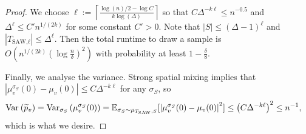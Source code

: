 \documentclass[10pt,a4paper]{article}
\newcommand{\htodo}[1]{\todo[color=green!30]{Heng: #1}}
\newcommand{\Ex}{\mathop{\mathbb{{}E}}\nolimits}
\newcommand{\abs}[1]{\ensuremath{\left\vert#1\right\vert}}
\newcommand{\Var}[2]{\ensuremath{\textnormal{Var}_{#1}\left(#2\right)}}
\newcommand{\defeq}{:=}
\newcommand{\TSAW}{T_{\mathrm{SAW}}}
\begin{document}
\begin{proof}
We choose $\ell\defeq\left\lceil\frac{\log(n)/2-\log C}{k\log(\Delta)}\right\rceil$ so that $C\Delta^{-k\ell}\le n^{-0.5}$ and $\Delta^\ell\le C' n^{1/(2k)}$ for some constant $C'>0$. 
Note that $|S|\le(\Delta-1)^\ell$ and $|T_\textrm{SAW,$\ell$}|\le \Delta^\ell$. 
Then the total runtime to draw a sample is $O(n^{1/(2k)}(\log \frac{n}{\delta})^2)$ with probability at least $1-\frac{\delta}{8}$.


Finally, we analyse the variance. Strong spatial mixing implies that $\abs{\mu_v^{\sigma_S}(0)-\mu_v(0)}\leq C\Delta^{-k\ell}$ for any $\sigma_S$, so
\begin{align}  \label{eqn:var-error}
  \Var{}{\widetilde{p}_v}=\Var{\sigma_S}{\mu_v^{\sigma_S}(0)}=\Ex_{\sigma_S\sim\mu_{\TSAW,S}}[\abs{\mu_v^{\sigma_S}(0)-\mu_v(0)}^2]
  &\leq \left(C\Delta^{-k\ell}\right)^2\leq n^{-1},
\end{align}
which is what we desire.
\end{proof}
\end{document}
